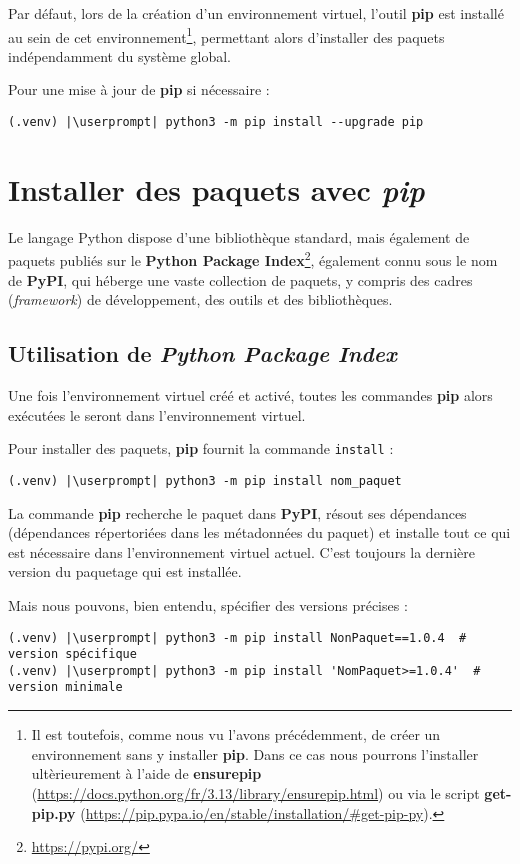 Par défaut, lors de la création d'un environnement virtuel, l'outil \textbf{pip} est installé au sein de cet environnement\footnote{Il est toutefois, comme nous vu l'avons précédemment, de créer un environnement sans y installer \textbf{pip}. Dans ce cas nous pourrons l'installer ultèrieurement à l'aide de \textbf{ensurepip} (\url{https://docs.python.org/fr/3.13/library/ensurepip.html}) ou via le script \textbf{get-pip.py} (\url{https://pip.pypa.io/en/stable/installation/\#get-pip-py}).}, permettant alors d'installer des paquets indépendamment du système global.

Pour une mise à jour de \textbf{pip} si nécessaire :
\begin{lstlisting}[style=bash]
(.venv) |\userprompt| python3 -m pip install --upgrade pip
\end{lstlisting}

\section{Installer des paquets avec \textit{pip}}
Le langage Python dispose d'une bibliothèque standard, mais également de paquets publiés sur le \textbf{Python Package Index}\footnote{\url{https://pypi.org/}}, également connu sous le nom de \textbf{PyPI}, qui  héberge une vaste collection de paquets, y compris des cadres (\textit{framework}) de développement, des outils et des bibliothèques.

\subsection*{Utilisation de \textit{Python Package Index}}
Une fois l'environnement virtuel créé et activé, toutes les commandes \textbf{pip} alors exécutées le seront dans l'environnement virtuel.

Pour installer des paquets, \textbf{pip} fournit la commande \texttt{install} : 
\begin{lstlisting}[style=bash]
(.venv) |\userprompt| python3 -m pip install nom_paquet
\end{lstlisting}

La commande \textbf{pip} recherche le paquet dans \textbf{PyPI}, résout ses dépendances (dépendances répertoriées dans les métadonnées du paquet) et installe tout ce qui est nécessaire dans l'environnement virtuel actuel. C'est toujours la dernière version du paquetage qui est installée. 

Mais nous pouvons, bien entendu, spécifier des versions précises :
\begin{lstlisting}[style=bash]
(.venv) |\userprompt| python3 -m pip install NonPaquet==1.0.4  # version spécifique
(.venv) |\userprompt| python3 -m pip install 'NomPaquet>=1.0.4'  # version minimale
\end{lstlisting}

